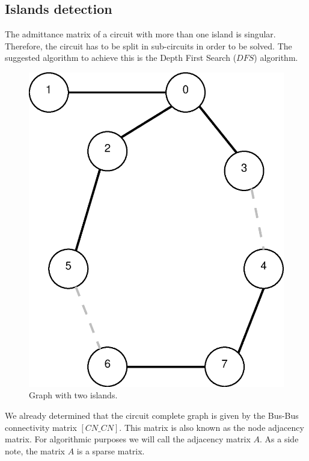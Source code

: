 \documentclass[nols,a4paper,twoside,notoc,fleqn]{tufte-book}
\begin{document}
\subsection{Islands detection}

The admittance matrix of a circuit with more than one island is singular. Therefore, the circuit has to be split in sub-circuits in order to be solved. The suggested algorithm to achieve this is the Depth First Search ($DFS$) algorithm.

\begin{figure}[h!]
	\centering
	\includegraphics[width=0.35\linewidth]{img/general_graph.eps}
	\caption{Graph with two islands.}
	\label{fig:general_graph}
\end{figure}


We already determined that the circuit complete graph is given by the Bus-Bus connectivity matrix $[CN\_CN]$. This matrix is also known as the node adjacency matrix. For algorithmic purposes we will call the adjacency matrix $A$. As a side note, the matrix $A$ is a sparse matrix. 

\end{document}
